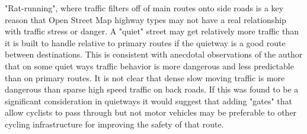 "Rat-running", where traffic filters off of main routes onto side roads is a key reason that Open Street Map highway types may not have a real relationship with traffic stress or danger. A "quiet" street may get relatively more traffic than it is built to handle relative to primary routes if the quietway is a good route between destinations. This is consistent with anecdotal observations of the author that on some quiet ways traffic behavior is more dangerous and less predictable than on primary routes. It is not clear that dense slow moving traffic is more dangerous than sparse high speed traffic on back roads. If this was found to be a significant consideration in quietways it would suggest that adding "gates" that allow cyclists to pass through  but not motor vehicles may be preferable to other cycling infrastructure for improving the safety of that route. 